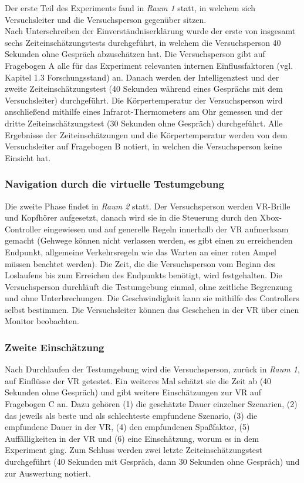 \documentclass{Paper}
\begin{document}
Der erste Teil des Experiments fand in \textit{Raum 1} statt, in welchem sich Versuchsleiter und die Versuchsperson gegenüber sitzen.\\
Nach Unterschreiben der Einverständniserklärung wurde der erste von insgesamt sechs Zeiteinschätzungstests durchgeführt, in welchem die Versuchsperson 40 Sekunden ohne Gespräch abzuschätzen hat. Die Versuchsperson gibt auf Fragebogen A alle für das Experiment relevanten internen Einflussfaktoren (vgl. Kapitel 1.3  Forschungsstand) an.
Danach werden der Intelligenztest und der zweite Zeiteinschätzungstest (40 Sekunden während eines Gesprächs mit dem Versuchsleiter) durchgeführt. Die Körpertemperatur der Versuchsperson wird anschließend mithilfe eines Infrarot-Thermometers am Ohr gemessen und der dritte Zeiteinschätzungstest (30 Sekunden ohne Gespräch) durchgeführt.
Alle Ergebnisse der Zeiteinschätzungen und die
Körpertemperatur werden von dem Versuchsleiter auf Fragebogen B notiert, in welchen die Versuchsperson keine Einsicht hat.

\subsubsection{Navigation durch die virtuelle Testumgebung}
Die zweite Phase findet in \textit{Raum 2} statt. Der Versuchsperson werden VR-Brille und Kopfhörer aufgesetzt, danach wird sie in die Steuerung durch den Xbox-Controller eingewiesen und auf generelle Regeln innerhalb der VR aufmerksam gemacht (Gehwege können nicht verlassen werden, es gibt einen zu erreichenden Endpunkt, allgemeine Verkehrsregeln wie das Warten an einer roten Ampel müssen beachtet werden). 
Die Zeit, die die Versuchsperson vom Beginn des Loslaufens bis zum Erreichen des Endpunkts benötigt, wird festgehalten.
Die Versuchsperson durchläuft die Testumgebung einmal, ohne zeitliche Begrenzung und ohne Unterbrechungen. Die Geschwindigkeit kann sie mithilfe des Controllers selbst bestimmen. Die Versuchsleiter können das Geschehen in der VR über einen Monitor beobachten.

\subsubsection{Zweite Einschätzung}
Nach Durchlaufen der Testumgebung wird die Versuchsperson, zurück in \textit{Raum 1}, auf Einflüsse der VR getestet. Ein weiteres Mal schätzt sie die Zeit ab (40 Sekunden ohne Gespräch) und gibt weitere Einschätzungen zur VR auf Fragebogen C an. Dazu gehören (1) die geschätzte Dauer einzelner Szenarien, (2) das jeweils als beste und als schlechteste empfundene Szenario, (3)  die empfundene Dauer in der VR, (4) den empfundenen Spaßfaktor, (5) Auffälligkeiten in der VR und (6) eine Einschätzung, worum es in dem Experiment ging.
Zum Schluss werden zwei letzte Zeiteinschätzungstest durchgeführt (40 Sekunden mit Gespräch, dann 30 Sekunden ohne Gespräch) und zur Auswertung notiert.
\end{document}

